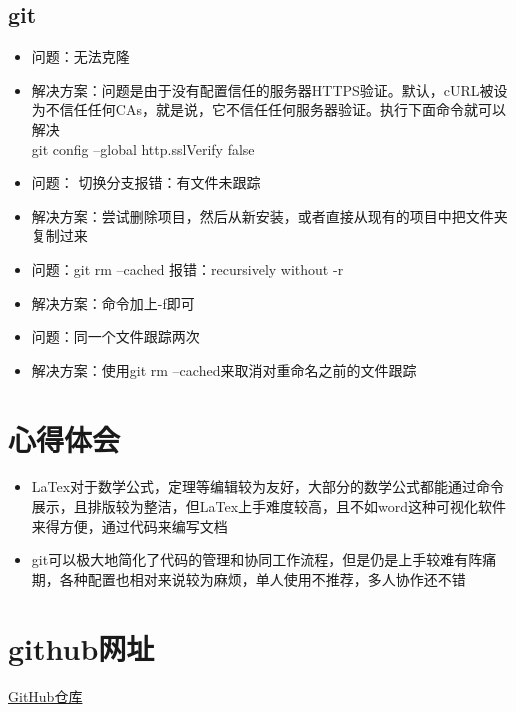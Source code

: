 \documentclass[UTF8]{ctexart}
\begin{document}
\subsection{git}
\begin{itemize}
\item 问题：无法克隆
\item 解决方案：问题是由于没有配置信任的服务器HTTPS验证。默认，cURL被设为不信任任何CAs，就是说，它不信任任何服务器验证。执行下面命令就可以解决\\
git config --global http.sslVerify false


\item 问题： 切换分支报错：有文件未跟踪
\item 解决方案：尝试删除项目，然后从新安装，或者直接从现有的项目中把文件夹复制过来

\item 问题：git rm --cached 报错：recursively without -r
\item 解决方案：命令加上-f即可

\item 问题：同一个文件跟踪两次
\item 解决方案：使用git rm --cached来取消对重命名之前的文件跟踪
 \end{itemize}






  \section{心得体会}
\begin{itemize}
  \item LaTex对于数学公式，定理等编辑较为友好，大部分的数学公式都能通过命令展示，且排版较为整洁，但LaTex上手难度较高，且不如word这种可视化软件来得方便，通过代码来编写文档\\
  \item git可以极大地简化了代码的管理和协同工作流程，但是仍是上手较难有阵痛期，各种配置也相对来说较为麻烦，单人使用不推荐，多人协作还不错
\end{itemize}

  

  \section{github网址}
\href{https://github.com/KeepingMoving/work1.git}{GitHub仓库}
 
\end{document}
